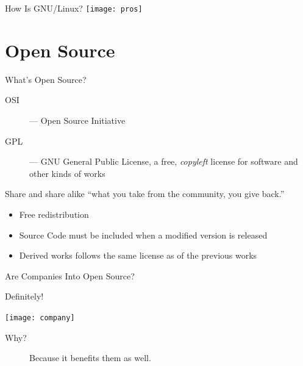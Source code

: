 \begin{frame}{How Is GNU/Linux?}
  \centering
  \texttt{[image: pros]}
\end{frame}

\section{Open Source}

\begin{frame}{What's Open Source?}
  \begin{description}
  \item[OSI] --- Open Source Initiative
  \item[GPL] --- GNU General Public License, a free, \emph{copyleft} license for software and
    other kinds of works
  \end{description}
  \begin{block}{Share and share alike}
    {\small\purisa ``what you take from the community, you give back.''}
    \begin{itemize}
    \item Free redistribution
    \item Source Code must be included when a modified version is
      released
    \item Derived works follows the same license as of the previous
      works
    \end{itemize}
  \end{block}
\end{frame}

\begin{frame}{Are Companies Into Open Source?}
  \begin{block}{Definitely!}
    \begin{center}
      \texttt{[image: company]}
    \end{center}
  \end{block}
  \begin{description}
  \item[Why?]  Because it benefits them as well.
  \end{description}
\end{frame}

